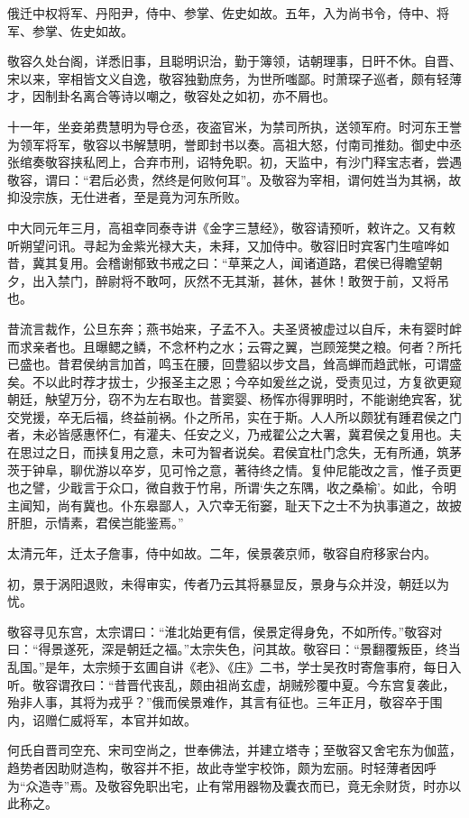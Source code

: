 \documentclass[12pt,UTF8]{ctexbook}
\begin{document}
俄迁中权将军、丹阳尹，侍中、参掌、佐史如故。五年，入为尚书令，侍中、将军、参掌、佐史如故。

敬容久处台阁，详悉旧事，且聪明识治，勤于簿领，诘朝理事，日旰不休。自晋、宋以来，宰相皆文义自逸，敬容独勤庶务，为世所嗤鄙。时萧琛子巡者，颇有轻薄才，因制卦名离合等诗以嘲之，敬容处之如初，亦不屑也。

十一年，坐妾弟费慧明为导仓丞，夜盗官米，为禁司所执，送领军府。时河东王誉为领军将军，敬容以书解慧明，誉即封书以奏。高祖大怒，付南司推劾。御史中丞张绾奏敬容挟私罔上，合弃市刑，诏特免职。初，天监中，有沙门释宝志者，尝遇敬容，谓曰：“君后必贵，然终是何败何耳”。及敬容为宰相，谓何姓当为其祸，故抑没宗族，无仕进者，至是竟为河东所败。

中大同元年三月，高祖幸同泰寺讲《金字三慧经》，敬容请预听，敕许之。又有敕听朔望问讯。寻起为金紫光禄大夫，未拜，又加侍中。敬容旧时宾客门生喧哗如昔，冀其复用。会稽谢郁致书戒之曰：“草莱之人，闻诸道路，君侯已得瞻望朝夕，出入禁门，醉尉将不敢呵，灰然不无其渐，甚休，甚休！敢贺于前，又将吊也。

昔流言裁作，公旦东奔；燕书始来，子孟不入。夫圣贤被虚过以自斥，未有婴时衅而求亲者也。且曝鳃之鳞，不念杯杓之水；云霄之翼，岂顾笼樊之粮。何者？所托已盛也。昔君侯纳言加首，鸣玉在腰，回豊貂以步文昌，耸高蝉而趋武帐，可谓盛矣。不以此时荐才拔士，少报圣主之恩；今卒如爰丝之说，受责见过，方复欲更窥朝廷，觖望万分，窃不为左右取也。昔窦婴、杨恽亦得罪明时，不能谢绝宾客，犹交党援，卒无后福，终益前祸。仆之所吊，实在于斯。人人所以颇犹有踵君侯之门者，未必皆感惠怀仁，有灌夫、任安之义，乃戒翟公之大署，冀君侯之复用也。夫在思过之日，而挟复用之意，未可为智者说矣。君侯宜杜门念失，无有所通，筑茅茨于钟阜，聊优游以卒岁，见可怜之意，著待终之情。复仲尼能改之言，惟子贡更也之譬，少戢言于众口，微自救于竹帛，所谓‘失之东隅，收之桑榆’。如此，令明主闻知，尚有冀也。仆东皋鄙人，入穴幸无衔窭，耻天下之士不为执事道之，故披肝胆，示情素，君侯岂能鉴焉。”

太清元年，迁太子詹事，侍中如故。二年，侯景袭京师，敬容自府移家台内。

初，景于涡阳退败，未得审实，传者乃云其将暴显反，景身与众并没，朝廷以为忧。

敬容寻见东宫，太宗谓曰：“淮北始更有信，侯景定得身免，不如所传。”敬容对曰：“得景遂死，深是朝廷之福。”太宗失色，问其故。敬容曰：“景翻覆叛臣，终当乱国。”是年，太宗频于玄圃自讲《老》、《庄》二书，学士吴孜时寄詹事府，每日入听。敬容谓孜曰：“昔晋代丧乱，颇由祖尚玄虚，胡贼殄覆中夏。今东宫复袭此，殆非人事，其将为戎乎？”俄而侯景难作，其言有征也。三年正月，敬容卒于围内，诏赠仁威将军，本官并如故。

何氏自晋司空充、宋司空尚之，世奉佛法，并建立塔寺；至敬容又舍宅东为伽蓝，趋势者因助财造构，敬容并不拒，故此寺堂宇校饰，颇为宏丽。时轻薄者因呼为“众造寺”焉。及敬容免职出宅，止有常用器物及囊衣而已，竟无余财货，时亦以此称之。
\end{document}
